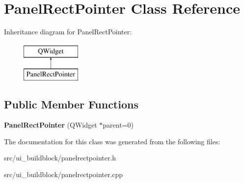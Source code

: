 \hypertarget{classPanelRectPointer}{}\section{Panel\+Rect\+Pointer Class Reference}
\label{classPanelRectPointer}
Inheritance diagram for Panel\+Rect\+Pointer\+:\begin{figure}[H]
\begin{center}
\leavevmode
\includegraphics[height=2.000000cm]{classPanelRectPointer}
\end{center}
\end{figure}
\subsection*{Public Member Functions}
\begin{DoxyCompactItemize}
\item 
\mbox{\label{classPanelRectPointer_ab676f08ddc72852f5c02bd1b8be92282}} 
{\bfseries Panel\+Rect\+Pointer} (Q\+Widget $\ast$parent=0)
\end{DoxyCompactItemize}


The documentation for this class was generated from the following files\+:\begin{DoxyCompactItemize}
\item 
src/ui\+\_\+buildblock/panelrectpointer.\+h\item 
src/ui\+\_\+buildblock/panelrectpointer.\+cpp\end{DoxyCompactItemize}
